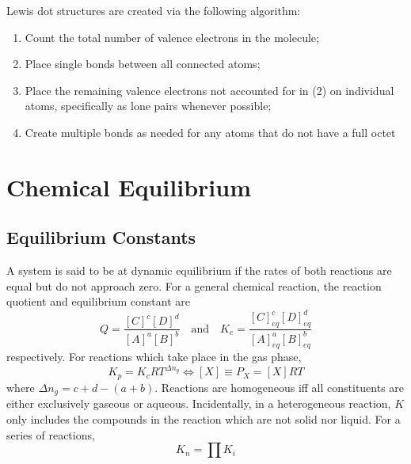 \documentclass{tufte-book}
\begin{document}
Lewis dot structures are created via the following algorithm: \begin{enumerate}
  \item Count the total number of valence electrons in the molecule;
  \item Place single bonds between all connected atoms;
  \item Place the remaining valence electrons not accounted for in (2) on individual atoms, specifically as lone pairs whenever possible;
  \item Create multiple bonds as needed for any atoms that do not have a full octet
\end{enumerate}

\chapter{Chemical Equilibrium}

\section{Equilibrium Constants}

A system is said to be at dynamic equilibrium if the rates of both reactions are equal but do not approach zero. For a general chemical reaction, the reaction quotient and equilibrium constant are
\begin{equation}
  Q = \frac{[C]^c [D]^d}{[A]^a [B]^b} \quad\text{and}\quad K_c = \frac{[C]^c_{eq} [D]^d_{eq}}{[A]^a_{eq} [B]^b_{eq}}
\end{equation}
respectively. For reactions which take place in the gas phase, \begin{equation}
  K_p = K_c RT^{\Delta n_g} \iff [X] \equiv P_X = [X]RT
\end{equation}
where $\Delta n_g = c+d-(a+b)$. Reactions are homogeneous iff all constituents are either exclusively gaseous or aqueous. Incidentally, in a heterogeneous reaction, $K$ only includes the compounds in the reaction which are not solid nor liquid. For a series of reactions, \begin{equation}
  K_n = \prod K_i
\end{equation}
\end{document}
